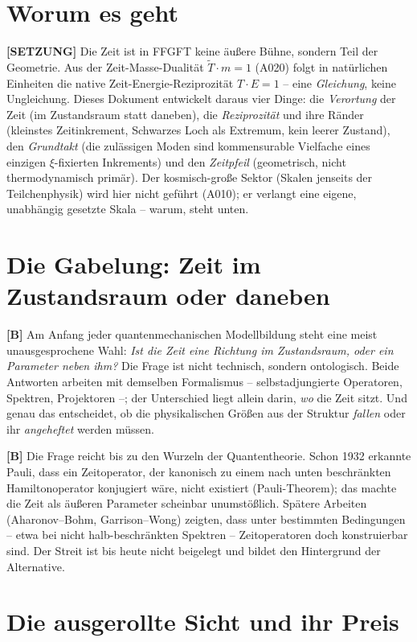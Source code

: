 \section{Worum es geht}

\textbf{[SETZUNG]} Die Zeit ist in FFGFT keine äußere Bühne, sondern Teil der
Geometrie. Aus der Zeit-Masse-Dualität $\tilde T\cdot m = 1$ (A020) folgt in
natürlichen Einheiten die native Zeit-Energie-Reziprozität $T\cdot E = 1$ -- eine
\emph{Gleichung}, keine Ungleichung. Dieses Dokument entwickelt daraus vier
Dinge: die \emph{Verortung} der Zeit (im Zustandsraum statt daneben), die
\emph{Reziprozität} und ihre Ränder (kleinstes Zeitinkrement, Schwarzes Loch als
Extremum, kein leerer Zustand), den \emph{Grundtakt} (die zulässigen Moden sind
kommensurable Vielfache eines einzigen $\xi$-fixierten Inkrements) und den
\emph{Zeitpfeil} (geometrisch, nicht thermodynamisch primär). Der kosmisch-große
Sektor (Skalen jenseits der Teilchenphysik) wird hier nicht geführt (A010); er
verlangt eine eigene, unabhängig gesetzte Skala -- warum, steht unten.

\section{Die Gabelung: Zeit im Zustandsraum oder daneben}

\textbf{[B]} Am Anfang jeder quantenmechanischen Modellbildung steht eine meist
unausgesprochene Wahl: \emph{Ist die Zeit eine Richtung im Zustandsraum, oder ein
Parameter neben ihm?} Die Frage ist nicht technisch, sondern ontologisch. Beide
Antworten arbeiten mit demselben Formalismus -- selbstadjungierte Operatoren,
Spektren, Projektoren --; der Unterschied liegt allein darin, \emph{wo} die Zeit
sitzt. Und genau das entscheidet, ob die physikalischen Größen aus der Struktur
\emph{fallen} oder ihr \emph{angeheftet} werden müssen.

\textbf{[B]} Die Frage reicht bis zu den Wurzeln der Quantentheorie. Schon 1932
erkannte Pauli, dass ein Zeitoperator, der kanonisch zu einem nach unten
beschränkten Hamiltonoperator konjugiert wäre, nicht existiert (Pauli-Theorem);
das machte die Zeit als äußeren Parameter scheinbar unumstößlich. Spätere Arbeiten
(Aharonov--Bohm, Garrison--Wong) zeigten, dass unter bestimmten Bedingungen --
etwa bei nicht halb-beschränkten Spektren -- Zeitoperatoren doch konstruierbar
sind. Der Streit ist bis heute nicht beigelegt und bildet den Hintergrund der
Alternative.

\section{Die ausgerollte Sicht und ihr Preis}

